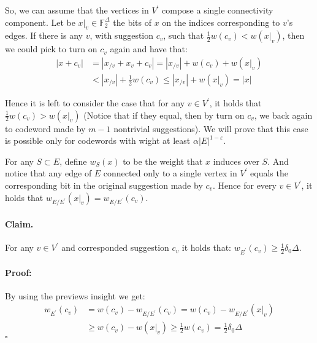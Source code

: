 \documentclass{article}
\begin{document}
\begin{multicols*}{2}
So, we can assume that the vertices in $V^\prime$ compose a single connectivity component. Let be $x|_{v} \in \mathbb{F}_{2}^{\Delta}$ the bits of $x$ on the indices corresponding to $v$'s edges. If there is any $v$, with suggestion $c_{v}$, such that $ \frac{1}{2}w\left( c_{v}\right) < w\left( x|_{v} \right)$, then we could pick to turn on $c_{v}$ again and have that:
\begin{equation*}
  \begin{split}
    |x+c_{v}| & = | x_{/v} + x_{v} + c_{v}| = |x_{/v}| + w\left( c_{v} \right) + w\left( x|_{v} \right) \\
    & < |x_{/v}| + \frac{1}{2}w\left( c_{v} \right) \le |x_{/v}| + w\left( x|_{v} \right) = |x|
  \end{split}
\end{equation*}

Hence it is left to consider the case that for any $v\in V^\prime$, it holds that $\frac{1}{2}w\left( c_{v}\right) >  w\left( x|_{v} \right)$ (Notice that if they equal, then by turn on $c_{v}$, we back again to codeword made by $m-1$ nontrivial suggestions). We will prove that this case is possible only for codewords with wight at least $\alpha|E|^{1-\varepsilon}$.

For any $S \subset E$, define $w_{S}\left( x \right)$ to be the weight that $x$ induces over $S$. And notice that any edge of $E$ connected only to a single vertex in $V^\prime$ equals the corresponding bit in the original suggestion made by $c_{v}$. Hence for every $v\in V^\prime$, it holds that $w_{E / E^\prime}\left(x|_{v}\right) = w_{E / E^\prime}\left(c_{v}\right)$. 
\paragraph{Claim.} For any $v \in V^\prime$ and corresponded suggestion $c_{v}$ it holds that: $w_{E^\prime}\left( c_{v} \right) \ge \frac{1}{2}\delta_{0}\Delta$. 
\paragraph{Proof:}By using the previews insight we get: \begin{equation*}
  \begin{split}
    w_{E^\prime}\left( c_{v} \right) &= w\left( c_{v} \right) - w_{E / E^\prime}\left( c_{v} \right) =  w\left( c_{v} \right) - w_{E / E^\prime}\left( x|_{v} \right) \\ 
     & \ge  w\left( c_{v} \right) - w\left( x|_{v} \right) \ge \frac{1}{2}w\left( c_{v} \right) = \frac{1}{2}\delta_{0}\Delta 
  \end{split}
\end{equation*}
$\square$


\end{multicols*}
\end{document}
